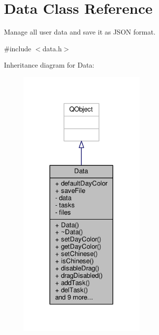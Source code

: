 \hypertarget{classData}{}\section{Data Class Reference}
\label{classData}


Manage all user data and save it as J\+S\+ON format.  




{\ttfamily \#include $<$data.\+h$>$}



Inheritance diagram for Data\+:
\nopagebreak
\begin{figure}[H]
\begin{center}
\leavevmode
\includegraphics[width=176pt]{classData__inherit__graph}
\end{center}
\end{figure}


